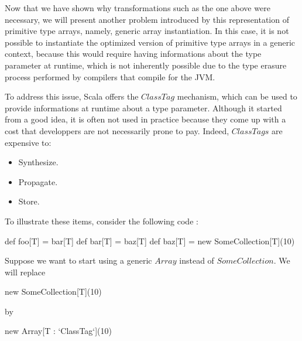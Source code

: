 
Now that we have shown why transformations such as the one above were necessary, we will present another problem introduced by this representation of primitive type arrays, namely, generic array instantiation. In this case, it is not possible to instantiate the optimized version of primitive type arrays in a generic context, because this would require having informations about the type parameter at runtime, which is not inherently possible due to the type erasure process performed by compilers that compile for the JVM. 


To address this issue, Scala offers the $ClassTag$ mechanism, which can be used to provide informations at runtime about a type parameter. Although it started from a good idea, it is often not used in practice because they come up with a cost that developpers are not necessarily prone to pay. Indeed, $ClassTags$ are expensive to:


\begin{itemize}
  \item Synthesize.
  \item Propagate.
  \item Store.
\end{itemize}

To illustrate these items, consider the following code : 

\begin{lstlisting-nobreak}
  def foo[T] = bar[T]
  def bar[T] = baz[T]
  def baz[T] = new SomeCollection[T](10)
\end{lstlisting-nobreak}

Suppose we want to start using a generic $Array$ instead of $SomeCollection$. We will replace
 
\begin{lstlisting-nobreak} 
  new SomeCollection[T](10) 
\end{lstlisting-nobreak}

by

\begin{lstlisting-nobreak} 
  new Array[T : `ClassTag`](10) 
\end{lstlisting-nobreak}

